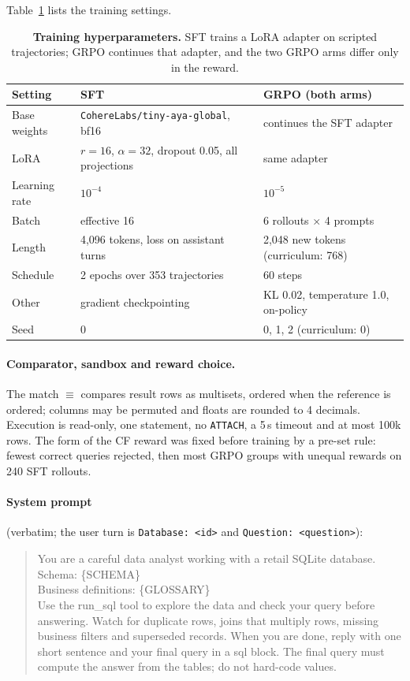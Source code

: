 \documentclass{article}
\begin{document}
Table~\ref{tab:hyper} lists the training settings.
\begin{table}[ht]
\caption{\textbf{Training hyperparameters.} SFT trains a LoRA adapter on scripted trajectories; GRPO continues that adapter, and the two GRPO arms differ only in the reward.}
\label{tab:hyper}
\centering\small
\begin{tabular}{lll}
\toprule
Setting & SFT & GRPO (both arms) \\
\midrule
Base weights & \texttt{CohereLabs/tiny-aya-global}, bf16 & continues the SFT adapter \\
LoRA & $r=16$, $\alpha=32$, dropout 0.05, all projections & same adapter \\
Learning rate & $10^{-4}$ & $10^{-5}$ \\
Batch & effective 16 & 6 rollouts $\times$ 4 prompts \\
Length & 4,096 tokens, loss on assistant turns & 2,048 new tokens (curriculum: 768) \\
Schedule & 2 epochs over 353 trajectories & 60 steps \\
Other & gradient checkpointing & KL 0.02, temperature 1.0, on-policy \\
Seed & 0 & 0, 1, 2 (curriculum: 0) \\
\bottomrule
\end{tabular}
\end{table}

\paragraph{Comparator, sandbox and reward choice.}
The match $\equiv$ compares result rows as multisets, ordered when the reference is ordered; columns may be permuted and floats are rounded to 4 decimals. Execution is read-only, one statement, no \texttt{ATTACH}, a 5\,s timeout and at most 100k rows. The form of the CF reward was fixed before training by a pre-set rule: fewest correct queries rejected, then most GRPO groups with unequal rewards on 240 SFT rollouts.

\paragraph{System prompt} (verbatim; the user turn is \texttt{Database: <id>} and \texttt{Question: <question>}):
\begin{quote}\small\ttfamily
You are a careful data analyst working with a retail SQLite database.\\
Schema: \{SCHEMA\}\\
Business definitions: \{GLOSSARY\}\\
Use the run\_sql tool to explore the data and check your query before answering. Watch for duplicate rows, joins that multiply rows, missing business filters and superseded records. When you are done, reply with one short sentence and your final query in a \textasciigrave\textasciigrave\textasciigrave sql block. The final query must compute the answer from the tables; do not hard-code values.
\end{quote}
\end{document}

